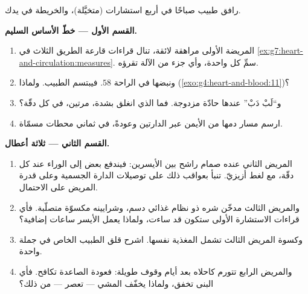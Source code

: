 \begin{problem}\label{pb:g7:heart-and-circulation:1}
رافق طبيب  صباحًا في أربع استشارات (متخيَّلة)، والخريطة في يدك.

\medskip\noindent\textbf{القسم الأول --- خطّ الأساس
السليم.}
\begin{enumerate}
  \item المريضة الأولى مراهقة لائقة، تنال قراءات قارعة الطريق
        الثلاث في
        \cref{ex:g7:heart-and-circulation:measures}. سمِّ كل
        واحدة، وأي جزء من الآلة تقرؤه.
  \item ونبضها في الراحة $58$. فيبتسم الطبيب. ولماذا
        (\cref{exo:g4:heart-and-blood:11})؟
  \item و``لَبْ دَبْ'' عندها حادّة مزدوجة. فما الذي انغلق بشدة،
        مرتين، في كل دقّة؟
  \item ارسم مسار دمها من  الأيمن عبر الدارتين وعودةً، في
        ثماني محطات مسمّاة.
\end{enumerate}

\medskip\noindent\textbf{القسم الثاني --- ثلاثة أعطال.}
\begin{enumerate}[resume]
  \item المريض الثاني عنده صمام راشح بين  
        الأيسرين: فيندفع بعض  إلى الوراء عند كل دقّة، مع
        لغط أزيزيّ. تنبأ بعواقب ذلك على توصيلات الدارة الجسمية
        وعلى قدرة المريض على الاحتمال.
  \item والمريض الثالث مدخّن شره ذو نظام غذائي دسم، وشرايينه
        مكسوّة متصلّبة. فأي قراءات الاستشارة الأولى ستكون قد
        ساءت، ولماذا يعمل  الأيسر ساعات إضافية؟
  \item وكسوة المريض الثالث تشمل   المغذية نفسها.
        اشرح قلق الطبيب الخاص في جملة واحدة.
  \item والمريض الرابع تتورم كاحلاه بعد أيام وقوف طويلة: فعودة
         الصاعدة تكافح. فأي البنى تخفق، ولماذا يخفّف
        المشي ---   تعصر  --- من ذلك؟
\end{enumerate}


\end{problem}
